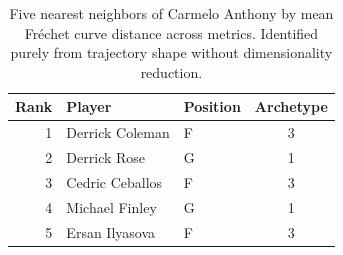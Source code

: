 \begin{table}[htbp]
  \centering\small
  \begin{tabular}{rllc}
    \toprule
    Rank & Player & Position & Archetype \\
    \midrule
    1 & Derrick Coleman & F & 3 \\
    2 & Derrick Rose & G & 1 \\
    3 & Cedric Ceballos & F & 3 \\
    4 & Michael Finley & G & 1 \\
    5 & Ersan Ilyasova & F & 3 \\
    \bottomrule
  \end{tabular}
  \caption{Five nearest neighbors of Carmelo Anthony by mean Fr\'{e}chet curve distance across metrics. Identified purely from trajectory shape without dimensionality reduction.}
  \label{tab:Carmelo_Anthony_frechet_curve_neighbors}
\end{table}

